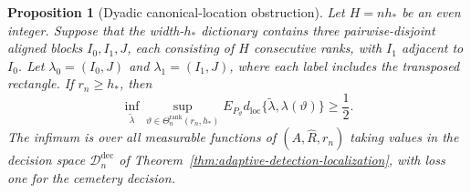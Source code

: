 \documentclass[11pt]{article}
\newtheorem{proposition}[theorem]{Proposition}
\theoremstyle{definition}
\newcommand{\1}{\mathbf 1}\newcommand{\op}{\operatorname}
\begin{document}
\begin{proposition}[Dyadic canonical-location obstruction]
\label{prop:T4-dyadic-obstruction}
Let $H=nh_*$ be an even integer.  Suppose that the width-$h_*$
dictionary contains three pairwise-disjoint aligned blocks
$I_0,I_1,J$, each consisting of $H$ consecutive ranks, with $I_1$
adjacent to $I_0$.  Let $\lambda_0=(I_0,J)$ and
$\lambda_1=(I_1,J)$, where each label includes the transposed
rectangle.  If $r_n\ge h_*$, then
\begin{equation}
 \inf_{\widetilde\lambda}
 \sup_{\vartheta\in\Theta_n^{\mathrm{rank}}(r_n,h_*)}
 E_{P_\vartheta}d_{\mathrm{loc}}
    \{\widetilde\lambda,\lambda(\vartheta)\}
 \ge\frac12.
 \label{eq:T4-rank-lower-bound}
\end{equation}
The infimum is over all measurable functions of
$(A,\widehat R,r_n)$ taking values in the decision space
$\mathcal D_n^{\mathrm{dec}}$ of
Theorem~\ref{thm:adaptive-detection-localization}, with loss one for
the cemetery decision.
\end{proposition}
\end{document}
